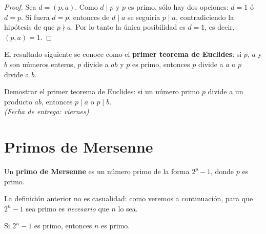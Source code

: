 \documentclass[12pt,a4paper]{book}
\begin{document}
  \begin{proof}
    Sea $d=(p,a)$. Como $d\mid p$ y $p$ es primo, sólo hay dos opciones: $d=1$ ó $d=p$. Si fuera $d=p$, entonces de $d\mid a$ se seguiría $p\mid a$, contradiciendo la hipótesis de que $p\nmid a$. Por lo tanto la única posibilidad es $d=1$, es decir, $(p,a)=1$.
  \end{proof}
  
  El resultado siguiente se conoce como el \textbf{primer teorema de Euclides}: si $p$, $a$ y $b$ son números enteros, $p$ divide a $ab$ y $p$ es primo, entonces $p$ divide a $a$ o $p$ divide a $b$.
  
  \begin{problema}
    Demostrar el primer teorema de Euclides: si un número primo $p$ divide a un producto $ab$, entonces $p\mid a$ o $p\mid b$. \\
    \emph{(Fecha de entrega: viernes)}
  \end{problema}
  
  \section{Primos de Mersenne}
  
  \begin{definicion}
    Un \textbf{primo de Mersenne} es un número primo de la forma $2^p-1$, donde $p$ es primo.
  \end{definicion}
  
  La definición anterior no es casualidad: como veremos a continuación, para que $2^n-1$ sea primo es \emph{necesario} que $n$ lo sea.
  
  \begin{teorema}
    Si $2^n-1$ es primo, entonces $n$ es primo.
  \end{teorema}
  
\end{document}
